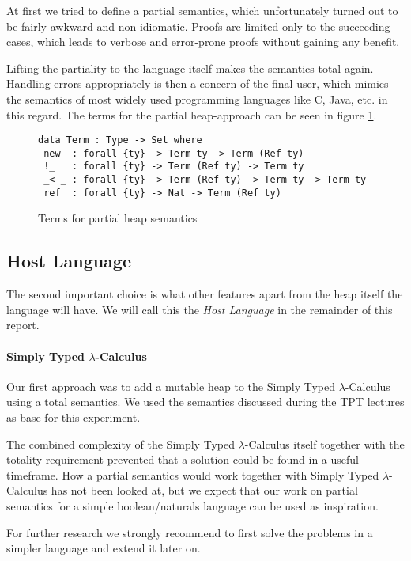 \documentclass[12pt, a4paper, oneside]{article}
\begin{document}
At first we tried to define a partial semantics, which unfortunately turned out to be fairly awkward and non-idiomatic. Proofs are limited only to the succeeding cases, which leads to verbose and error-prone proofs without gaining any benefit. 

Lifting the partiality to the language itself makes the semantics total again.
Handling errors appropriately is then a concern of the final user, which mimics the semantics of most widely used programming languages like C, Java, etc. in this regard.
The terms for the partial heap-approach can be seen in figure \ref{lst:part-term}.

\begin{figure}
\begin{lstlisting}
data Term : Type -> Set where
 new  : forall {ty} -> Term ty -> Term (Ref ty)
 !_   : forall {ty} -> Term (Ref ty) -> Term ty
 _<-_ : forall {ty} -> Term (Ref ty) -> Term ty -> Term ty
 ref  : forall {ty} -> Nat -> Term (Ref ty)
\end{lstlisting}
\caption{Terms for partial heap semantics}
\label{lst:part-term}
\end{figure}


\subsection{Host Language}
The second important choice is what other features apart from the heap itself the language will have. We will call this the \emph{Host Language} in the remainder of this report.


\paragraph{Simply Typed $\lambda$-Calculus}
Our first approach was to add a mutable heap to the Simply Typed $\lambda$-Calculus using a total semantics. We used the semantics discussed during the TPT lectures
as base for this experiment.

The combined complexity of the Simply Typed $\lambda$-Calculus itself together with the totality requirement prevented that a solution could be found in a useful timeframe.
How a partial semantics would work together with Simply Typed $\lambda$-Calculus has not been looked at, but we expect that our work on partial semantics for a simple
boolean/naturals language can be used as inspiration.

For further research we strongly recommend to first solve the problems in a simpler language and extend it later on.
\end{document}
